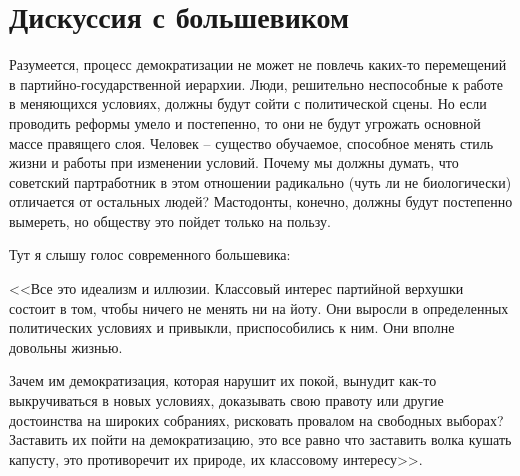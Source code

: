 \documentclass{book}
\begin{document}
\section{Дискуссия с большевиком}

Разумеется, процесс демократизации не может не повлечь каких-то перемещений в партийно-государственной иерархии. Люди, решительно неспособные к работе в меняющихся условиях, должны будут сойти с политической сцены. Но если проводить реформы умело и постепенно, то они не будут угрожать основной массе правящего слоя. Человек -- существо обучаемое, способное менять стиль жизни и работы при изменении условий. Почему мы должны думать, что советский партработник в этом отношении радикально (чуть ли не биологически) отличается от остальных людей? Мастодонты, конечно, должны будут постепенно вымереть, но обществу это пойдет только на пользу.

Тут я слышу голос современного большевика:

<<Все это идеализм и иллюзии. Классовый интерес партийной верхушки состоит в том, чтобы ничего не менять ни на йоту. Они выросли в определенных политических условиях и привыкли, приспособились к ним. Они вполне довольны жизнью.

Зачем им демократизация, которая нарушит их покой, выну­дит как-то выкручиваться в новых условиях, доказывать свою правоту или другие достоинства на широких собраниях, риско­вать провалом на свободных выборах? Заставить их пойти на демократизацию, это все равно что заставить волка кушать капусту, это противоречит их природе, их классовому интересу>>.
\end{document}
